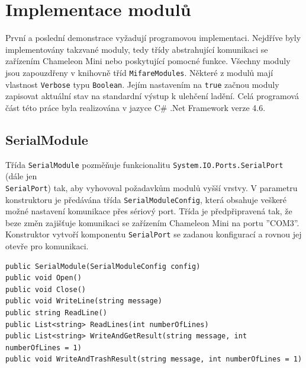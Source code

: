 \section{Implementace modulů}
\label{implementaceModulu}
První a poslední demonstrace vyžadují programovou implementaci. Nejdříve byly implementovány takzvané moduly, tedy třídy abstrahující komunikaci se zařízením Chameleon Mini nebo poskytující pomocné funkce. Všechny moduly jsou zapouzdřeny v knihovně tříd \verb|MifareModules|. Některé z modulů mají vlastnost \verb|Verbose| typu \verb|Boolean|. Jejím nastavením na \verb|true| začnou moduly zapisovat aktuální stav na standardní výstup k ulehčení ladění. Celá programová část této práce byla realizována v jazyce C\# .Net Framework verze 4.6.

\subsection*{SerialModule}
Třída \verb|SerialModule| pozměňuje funkcionalitu \verb|System.IO.Ports.SerialPort| (dále jen \\\verb|SerialPort|) tak, aby vyhovoval požadavkům modulů vyšší vrstvy. V parametru konstruktoru je předávána třída \verb|SerialModuleConfig|, která obsahuje veškeré možné nastavení komunikace přes sériový port. Třída je předpřipravená tak, že beze změn zajišťuje komunikaci se zařízením Chameleon Mini na portu ''COM3''. Konstruktor vytvoří komponentu \verb|SerialPort| se zadanou konfigurací a rovnou jej otevře pro komunikaci.

\begin{lstlisting}[caption=Metody třídy \emph{SerialModule}, label={serialModuleMethods}]
public SerialModule(SerialModuleConfig config)
public void Open()
public void Close()
public void WriteLine(string message)
public string ReadLine()
public List<string> ReadLines(int numberOfLines)
public List<string> WriteAndGetResult(string message, int numberOfLines = 1)
public void WriteAndTrashResult(string message, int numberOfLines = 1)
\end{lstlisting}

